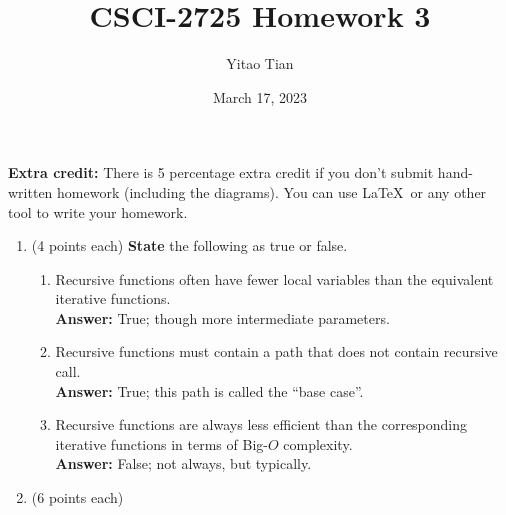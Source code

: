 \documentclass[12pt, a4paper]{article}
\title{CSCI-2725 Homework 3}
\author{Yitao Tian}
\date{March 17, 2023}
\begin{document}
\maketitle

\textbf{Extra credit:} There is 5 percentage extra credit if you don't submit hand-written homework (including the diagrams).
You can use \LaTeX\ or any other tool to write your homework.

\begin{enumerate}

    \item (4 points each) \textbf{State} the following as true or false.
    \begin{enumerate}
    
        \item Recursive functions often have fewer local variables than the equivalent iterative functions. \\
        \hspace*{\fill} \textbf{Answer:} True; though more intermediate parameters.

        \item Recursive functions must contain a path that does not contain recursive call. \\
        \hspace*{\fill} \textbf{Answer:} True; this path is called the ``base case''.
        
        \item Recursive functions are always less efficient than the corresponding iterative functions in terms of Big-$O$ complexity. \\
        \hspace*{\fill} \textbf{Answer:} False; not always, but typically.
    
    \end{enumerate}



    \newpage


    
    \item (6 points each)
       

\end{enumerate}
\end{document}
